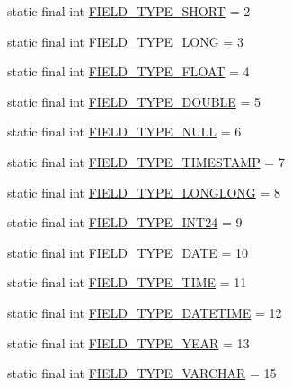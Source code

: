 \begin{DoxyCompactItemize}
\item 
static final int \mbox{\hyperlink{enumcom_1_1mysql_1_1cj_1_1_mysql_type_af7e36911e7651946d26a2756d624e4c3}{F\+I\+E\+L\+D\+\_\+\+T\+Y\+P\+E\+\_\+\+S\+H\+O\+RT}} = 2
\item 
static final int \mbox{\hyperlink{enumcom_1_1mysql_1_1cj_1_1_mysql_type_a6fcf496498a0bb4fc8692522fd78b63b}{F\+I\+E\+L\+D\+\_\+\+T\+Y\+P\+E\+\_\+\+L\+O\+NG}} = 3
\item 
static final int \mbox{\hyperlink{enumcom_1_1mysql_1_1cj_1_1_mysql_type_a16c7e065306cd60988ba2ac770d0456b}{F\+I\+E\+L\+D\+\_\+\+T\+Y\+P\+E\+\_\+\+F\+L\+O\+AT}} = 4
\item 
static final int \mbox{\hyperlink{enumcom_1_1mysql_1_1cj_1_1_mysql_type_a5110864ecdc11b7ecf72217a57bdd91d}{F\+I\+E\+L\+D\+\_\+\+T\+Y\+P\+E\+\_\+\+D\+O\+U\+B\+LE}} = 5
\item 
static final int \mbox{\hyperlink{enumcom_1_1mysql_1_1cj_1_1_mysql_type_aec6ea83bd1d1bbc9f00b80a2ae812c52}{F\+I\+E\+L\+D\+\_\+\+T\+Y\+P\+E\+\_\+\+N\+U\+LL}} = 6
\item 
static final int \mbox{\hyperlink{enumcom_1_1mysql_1_1cj_1_1_mysql_type_ad068078e4ad28809ae4094fdfb89343a}{F\+I\+E\+L\+D\+\_\+\+T\+Y\+P\+E\+\_\+\+T\+I\+M\+E\+S\+T\+A\+MP}} = 7
\item 
static final int \mbox{\hyperlink{enumcom_1_1mysql_1_1cj_1_1_mysql_type_ab69f890d1e09bc17d933eed831fbcc49}{F\+I\+E\+L\+D\+\_\+\+T\+Y\+P\+E\+\_\+\+L\+O\+N\+G\+L\+O\+NG}} = 8
\item 
static final int \mbox{\hyperlink{enumcom_1_1mysql_1_1cj_1_1_mysql_type_a84a6c7200d308375e7a5b84bd33e5728}{F\+I\+E\+L\+D\+\_\+\+T\+Y\+P\+E\+\_\+\+I\+N\+T24}} = 9
\item 
static final int \mbox{\hyperlink{enumcom_1_1mysql_1_1cj_1_1_mysql_type_ab689afad611dddd74654bcad1d2cf62b}{F\+I\+E\+L\+D\+\_\+\+T\+Y\+P\+E\+\_\+\+D\+A\+TE}} = 10
\item 
static final int \mbox{\hyperlink{enumcom_1_1mysql_1_1cj_1_1_mysql_type_a486f093ff93c093e557c3b48f8283030}{F\+I\+E\+L\+D\+\_\+\+T\+Y\+P\+E\+\_\+\+T\+I\+ME}} = 11
\item 
static final int \mbox{\hyperlink{enumcom_1_1mysql_1_1cj_1_1_mysql_type_a75182fc854c53623f551ac34eb34d137}{F\+I\+E\+L\+D\+\_\+\+T\+Y\+P\+E\+\_\+\+D\+A\+T\+E\+T\+I\+ME}} = 12
\item 
static final int \mbox{\hyperlink{enumcom_1_1mysql_1_1cj_1_1_mysql_type_a86c8b4d924d8fa1f496fb2c221168afb}{F\+I\+E\+L\+D\+\_\+\+T\+Y\+P\+E\+\_\+\+Y\+E\+AR}} = 13
\item 
static final int \mbox{\hyperlink{enumcom_1_1mysql_1_1cj_1_1_mysql_type_a49465cf00f79c58a6eda8fe0ea83d4e0}{F\+I\+E\+L\+D\+\_\+\+T\+Y\+P\+E\+\_\+\+V\+A\+R\+C\+H\+AR}} = 15

\end{DoxyCompactItemize}
